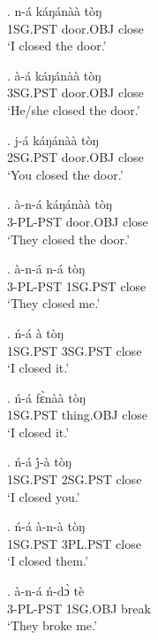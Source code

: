 \documentclass{assets/fieldnotes}
\begin{document}

\exg.
n-á        káŋánàà    tòŋ   \\
1SG.PST   door.OBJ   close \\%
`I closed the door.'

\exg.
à-á        káŋánàà    tòŋ   \\
3SG.PST   door.OBJ   close \\%
`He/she closed the door.'

\exg.
j-á        káŋánàà    tòŋ   \\
2SG.PST   door.OBJ   close \\%
`You closed the door.'

\exg.
à-n-á       káŋánàà    tòŋ   \\
3-PL-PST   door.OBJ   close \\%
`They closed the door.'

\exg.
à-n-á       n-á        tòŋ   \\
3-PL-PST   1SG.PST   close \\%
`They closed me.'

\exg.
ń-á        à           tòŋ   \\
1SG.PST   3SG.PST   close \\%
`I closed it.'

\exg.
ń-á        fɛ̀nàà       tòŋ   \\
1SG.PST   thing.OBJ   close \\%
`I closed it.'

\exg.
ń-á        j́-à        tòŋ   \\
1SG.PST   2SG.PST   close \\%
`I closed you.'

\exg.
ń-á        à-n-à       tòŋ   \\
1SG.PST   3PL.PST   close \\%
`I closed them.'

\exg.
à-n-á       ń-dɔ̀       tè    \\
3-PL-PST   1SG.OBJ   break \\%
`They broke me.'
\end{document}
